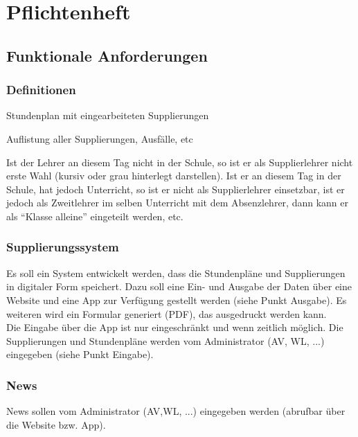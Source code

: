 \chapter{Pflichtenheft}

\section{Funktionale Anforderungen}

\subsection{Definitionen}
\begin{description}[style=nextline]
	\item[angepasster Stundenplan]
		Stundenplan mit eingearbeiteten Supplierungen 
	\item[tabellarischer Supplierplan]
		Auflistung aller Supplierungen, Ausfälle, etc
	\item[Relevanz bei Ersatzlehrern]
		Ist der Lehrer an diesem Tag nicht in der Schule, so ist er als Supplierlehrer nicht erste Wahl (kursiv oder grau hinterlegt darstellen). Ist er an diesem Tag in der Schule, hat jedoch Unterricht, so ist er nicht als Supplierlehrer einsetzbar, ist er jedoch als Zweitlehrer im selben Unterricht mit dem Absenzlehrer, dann kann er als \enquote{Klasse alleine} eingeteilt werden, etc.
\end{description}

\subsection{Supplierungssystem}
Es soll ein System entwickelt werden, dass die Stundenpläne und Supplierungen in digitaler Form speichert. Dazu soll eine Ein- und Ausgabe der Daten über eine Website und eine App zur Verfügung gestellt werden (siehe Punkt Ausgabe). Es weiteren wird ein Formular generiert (PDF), das ausgedruckt werden kann.\\
Die Eingabe über die App ist nur eingeschränkt und wenn zeitlich möglich. Die Supplierungen und Stundenpläne werden vom Administrator (AV, WL, ...) eingegeben (siehe Punkt Eingabe).

\subsection{News}
News sollen vom Administrator (AV,WL, ...) eingegeben werden (abrufbar über die Website bzw. App).

